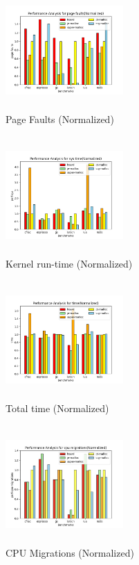 \documentclass[sigplan,screen]{acmart}
\begin{document}
\begin{figure}
\centering
\includegraphics[width=0.40\textwidth, height=4.5cm]{page faults(Normalized)_plot.png}
\caption{Page Faults (Normalized)}
\label{page_faults}
\end{figure}

\begin{figure}
\centering
\includegraphics[width=0.4\textwidth, height=4.5cm]{sys time(Normalized)_plot.png}
\caption{Kernel run-time (Normalized)}
\label{systime}
\end{figure}

\begin{figure}
\centering
\includegraphics[width=0.4\textwidth, height=4.5cm]{time(Normalized)_plot.png}
\caption{Total time (Normalized)}
\label{tottime}
\end{figure}

\begin{figure}
\centering
\includegraphics[width=0.4\textwidth, height=4.5cm]{cpu migrations.jpeg}
\caption{CPU Migrations (Normalized)}
\label{vue_snipp-4}
\end{figure}
\end{document}
